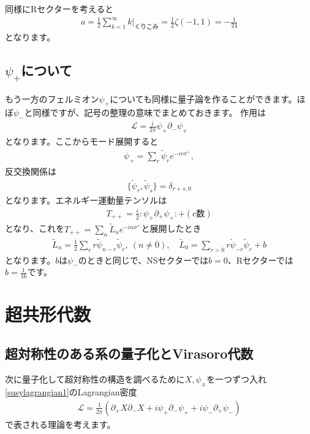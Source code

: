\documentclass[report,paper=a4, fontsize=12pt, line_length=16cm, number_of_lines=34,dvipdfmx]{jlreq}
\numberwithin{equation}{chapter}
\numberwithin{equation}{section}
\newcommand{\del}{\partial}
\newcommand{\Lt}{\widetilde{L}}
\newcommand{\psit}{\tilde{\psi}}
\newcommand{\Lcal}{\mathcal{L}}
\begin{document}
同様にRセクターを考えると
\begin{align}
  a=\frac12 \sum_{k=1}^{\infty}k\Bigg|_{\text{くりこみ}}=\frac12\zeta(-1,1)=-\frac{1}{24}
  \label{aRfermion1}
\end{align}
となります。

\subsection{$\psi_+$について}
もう一方のフェルミオン$\psi_+$についても同様に量子論を作ることができます。ほぼ$\psi_{-}$と同様ですが、記号の整理の意味でまとめておきます。
作用は
\begin{align}
  \Lcal=\frac{i}{2\pi}\psi_{+}\del_{-}\psi_{+}
\end{align}
となります。ここからモード展開すると
\begin{align}
  \psi_{+}=\sum_{r}\psit_r e^{-ir\sigma^{+}},
\end{align}
反交換関係は
\begin{align}
  \{\psit_r,\psit_s\}=\delta_{r+s,0}
\end{align}
となります。エネルギー運動量テンソルは
\begin{align}
  T_{++}=\frac{i}{2}:\psi_{+}\del_{+}\psi_{+}:+(\text{c数})
\end{align}
となり、これを$T_{++}=\sum_{n}\Lt_n e^{-in\sigma^{+}}$と展開したとき
\begin{align}
  \Lt_n=\frac12 \sum_{r}r \psit_{n-r}\psit_{r},\ (n\ne 0),
  \quad
  \Lt_0=\sum_{r>0}r \psit_{-r}\psit_{r}+b
\end{align}
となります。$b$は$\psi_{-}$のときと同じで、NSセクターでは$b=0$、Rセクターでは$b=\frac{1}{16}$です。

\section{超共形代数}
\subsection{超対称性のある系の量子化とVirasoro代数}
次に量子化して超対称性の構造を調べるために$X,\psi_{\pm}$を一つずつ入れ\eqref{susylagrangian1}のLagrangian密度
\begin{align}
  \Lcal=\frac{1}{2\pi}\left( 
    \del_{+}X\del_{-}X+i\psi_{+}\del_{-}\psi_{+}+i\psi_{-}\del_{+}\psi_{-}
   \right)
\end{align}
で表される理論を考えます。
\end{document}
